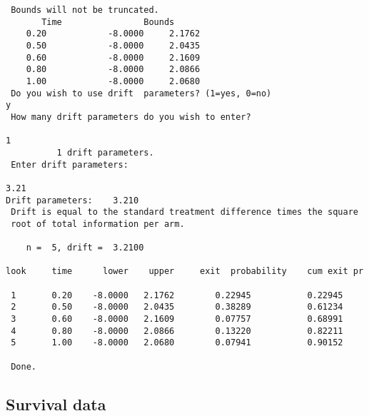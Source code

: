 {{\begin{verbatim}
 Bounds will not be truncated.
       Time                Bounds
    0.20            -8.0000     2.1762
    0.50            -8.0000     2.0435
    0.60            -8.0000     2.1609
    0.80            -8.0000     2.0866
    1.00            -8.0000     2.0680
 Do you wish to use drift  parameters? (1=yes, 0=no)                          y
 How many drift parameters do you wish to enter?
                                                                              1
          1 drift parameters.
 Enter drift parameters:
                                                                            3.21
Drift parameters:    3.210
 Drift is equal to the standard treatment difference times the square
 root of total information per arm.

    n =  5, drift =  3.2100

look     time      lower    upper     exit  probability    cum exit pr

 1       0.20    -8.0000   2.1762        0.22945           0.22945
 2       0.50    -8.0000   2.0435        0.38289           0.61234
 3       0.60    -8.0000   2.1609        0.07757           0.68991
 4       0.80    -8.0000   2.0866        0.13220           0.82211
 5       1.00    -8.0000   2.0680        0.07941           0.90152

 Done.
\end{verbatim}}}



\subsection{Survival data}

